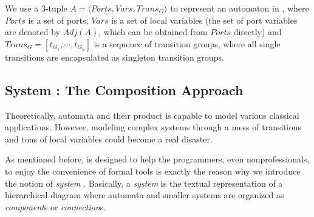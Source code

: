 

We use a 3-tuple $A=\langle Ports, Vars, Trans_G \rangle$ to represent an automaton in \lang{}, where $Ports$ is a set of ports, $Vars$ is a set of local variables (the set of port variables are denoted by $Adj(A)$, which can be obtained from $Ports$ directly) and $Trans_G=[t_{G_1},\cdots,t_{G_n}]$ is a sequence of transition groups, where all single transitions are encapsulated as singleton transition groups.

\subsection{System : The Composition Approach}
\label{subsec:system}

Theoretically, automata and their product is capable to model various classical applications. However, modeling complex systems through a mess of transitions and tons of local variables could become a real disaster.

As mentioned before, \lang{} is designed to help the programmers, even nonprofessionals, to enjoy the convenience of formal tools is exactly the reason why we introduce the notion of \emph{system} . Basically, a \emph{system} is the textual representation of a hierarchical diagram where automata and smaller systems are organized as \emph{component}s or 
\emph{connection}s. 


